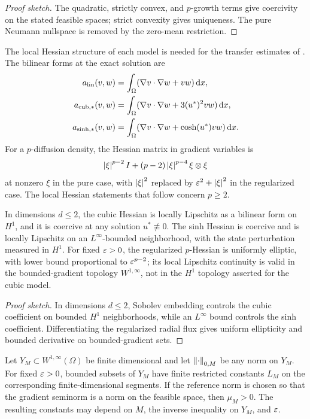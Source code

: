 \begin{proof}[Proof sketch]
The quadratic, strictly convex, and $p$-growth terms give coercivity on the stated feasible spaces; strict convexity gives uniqueness.  The pure Neumann nullspace is removed by the zero-mean restriction.
\end{proof}

The local Hessian structure of each model is needed for the transfer estimates of
. The bilinear forms at the exact solution are
\begin{align*}
 a_{\rm lin}(v,w)&=\int_\Omega(\nabla v\cdot\nabla w+vw)\,\mathrm{d} x,\\
 a_{\rm cub,*}(v,w)&=\int_\Omega(\nabla v\cdot\nabla w+3(u^*)^2vw)\,\mathrm{d} x,\\
 a_{\sinh,*}(v,w)&=\int_\Omega(\nabla v\cdot\nabla w+\cosh(u^*)vw)\,\mathrm{d} x.
\end{align*}
For a \(p\)-diffusion density, the Hessian matrix in gradient variables is
\[
 \left\lvert \xi\right\rvert^{p-2}I+(p-2)\left\lvert \xi\right\rvert^{p-4}\xi\otimes\xi
\]
at nonzero \(\xi\) in the pure case, with \(\left\lvert \xi\right\rvert^2\) replaced by
\(\varepsilon^2+\left\lvert \xi\right\rvert^2\) in the regularized case. The local Hessian statements that follow concern
\(p\geq2\).

\begin{proposition}
\label{prop:model-hessian}
In dimensions \(d\leq2\), the cubic Hessian is locally Lipschitz as a bilinear form on \(H^1\), and it
is coercive at any solution \(u^*\not\equiv0\). The sinh Hessian is coercive and is locally Lipschitz on
an \(L^\infty\)-bounded neighborhood, with the state perturbation measured in \(H^1\). For fixed
\(\varepsilon>0\), the regularized \(p\)-Hessian is uniformly elliptic, with lower bound proportional to
\(\varepsilon^{p-2}\); its local Lipschitz continuity is valid in the bounded-gradient topology
\(W^{1,\infty}\), not in the \(H^1\) topology asserted for the cubic model.
\end{proposition}

\begin{proof}[Proof sketch]
In dimensions $d\leq2$, Sobolev embedding controls the cubic coefficient on bounded $H^1$ neighborhoods, while an $L^\infty$ bound controls the sinh coefficient.  Differentiating the regularized radial flux gives uniform ellipticity and bounded derivative on bounded-gradient sets.
\end{proof}

\begin{proposition}
\label{prop:regularized-restricted}
Let \(Y_M\subset W^{1,\infty}(\Omega)\) be finite dimensional and let \(\left\lVert \cdot\right\rVert_{0,M}\) be any norm
on \(Y_M\). For fixed \(\varepsilon>0\), bounded subsets of \(Y_M\) have finite restricted constants
\(L_M\) on the corresponding finite-dimensional segments. If the reference norm is chosen so that the gradient seminorm is a
norm on the feasible space, then \(\mu_M>0\). The resulting constants may depend on \(M\), the inverse
inequality on \(Y_M\), and \(\varepsilon\).
\end{proposition}

